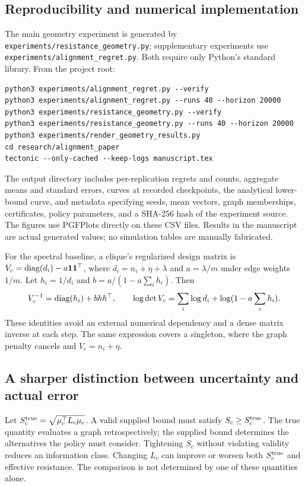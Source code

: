 \subsection{Reproducibility and numerical implementation}
The main geometry experiment is generated by
\texttt{experiments/resistance\_geometry.py}; supplementary experiments use
\texttt{experiments/alignment\_regret.py}. Both require only Python's standard library. From the project root:
\begin{verbatim}
python3 experiments/alignment_regret.py --verify
python3 experiments/alignment_regret.py --runs 40 --horizon 20000
python3 experiments/resistance_geometry.py --verify
python3 experiments/resistance_geometry.py --runs 40 --horizon 20000
python3 experiments/render_geometry_results.py
cd research/alignment_paper
tectonic --only-cached --keep-logs manuscript.tex
\end{verbatim}
The output directory includes per-replication regrets and counts, aggregate means and standard errors, curves at recorded checkpoints, the analytical lower-bound curve, and metadata specifying seeds, mean vectors, graph memberships, certificates, policy parameters, and a SHA-256 hash of the experiment source. The figures use PGFPlots directly on these CSV files. Results in the manuscript are actual generated values; no simulation tables are manually fabricated.

For the spectral baseline, a clique's regularized design matrix is
$V_c=\operatorname{diag}(d_i)-a\mathbf1\mathbf1^\top$, where $d_i=n_i+\eta+\lambda$ and $a=\lambda/m$ under edge weights $1/m$. Let $h_i=1/d_i$ and $b=a/(1-a\sum_i h_i)$. Then
\begin{equation}
 V_c^{-1}=\operatorname{diag}(h_i)+b hh^\top,\qquad
 \log\det V_c=\sum_i\log d_i+\log(1-a\sum_i h_i).
\end{equation}
These identities avoid an external numerical dependency and a dense matrix inverse at each step. The same expression covers a singleton, where the graph penalty cancels and $V_c=n_i+\eta$.

\subsection{A sharper distinction between uncertainty and actual error}
Let $S_c^{\rm true}=\sqrt{\mu_c^\top L_c\mu_c}$. A valid supplied bound must satisfy $S_c\ge S_c^{\rm true}$. The true quantity evaluates a graph retrospectively; the supplied bound determines the alternatives the policy must consider. Tightening $S_c$ without violating validity reduces an information class. Changing $L_c$ can improve or worsen both $S_c^{\rm true}$ and effective resistance. The comparison is not determined by one of these quantities alone.

